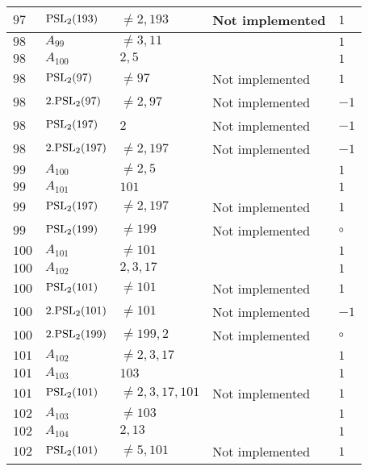 \documentclass[a4paper, 11pt]{article}
\begin{document}
\begin{longtable}{lllll}
        $ 97 $ & $ {\rm PSL}_{2}(193) $ & $ \neq 2, 193 $ & Not implemented & $ 1  $ \\ \hline
        $ 98 $ & $ A_{99} $ & $ \neq 3, 11 $ & $ ~ $ & $ 1  $ \\ \hline
        $ 98 $ & $ A_{100} $ & $ 2, 5 $ & $ ~ $ & $ 1  $ \\ \hline
        $ 98 $ & $ {\rm PSL}_{2}(97) $ & $ \neq 97 $ & Not implemented & $ 1  $ \\ \hline
        $ 98 $ & $ 2.{\rm PSL}_{2}(97) $ & $ \neq 2, 97 $ & Not implemented & $ -1  $ \\ \hline
        $ 98 $ & $ {\rm PSL}_{2}(197) $ & $ 2 $ & Not implemented & $ -1  $ \\ \hline
        $ 98 $ & $ 2.{\rm PSL}_{2}(197) $ & $ \neq 2, 197 $ & Not implemented & $ -1  $ \\ \hline
        $ 99 $ & $ A_{100} $ & $ \neq 2, 5 $ & $ ~ $ & $ 1  $ \\ \hline
        $ 99 $ & $ A_{101} $ & $ 101 $ & $ ~ $ & $ 1  $ \\ \hline
        $ 99 $ & $ {\rm PSL}_{2}(197) $ & $ \neq 2, 197 $ & Not implemented & $ 1  $ \\ \hline
        $ 99 $ & $ {\rm PSL}_{2}(199) $ & $ \neq 199 $ & Not implemented & $\circ$ \\ \hline
        $ 100 $ & $ A_{101} $ & $ \neq 101 $ & $ ~ $ & $ 1  $ \\ \hline
        $ 100 $ & $ A_{102} $ & $ 2, 3, 17 $ & $ ~ $ & $ 1  $ \\ \hline
        $ 100 $ & $ {\rm PSL}_{2}(101) $ & $ \neq 101 $ & Not implemented & $ 1  $ \\ \hline
        $ 100 $ & $ 2.{\rm PSL}_{2}(101) $ & $ \neq 101 $ & Not implemented & $ -1  $ \\ \hline
        $ 100 $ & $ 2.{\rm PSL}_{2}(199) $ & $ \neq 199, 2 $ & Not implemented & $\circ$ \\ \hline
        $ 101 $ & $ A_{102} $ & $ \neq 2, 3, 17 $ & $ ~ $ & $ 1  $ \\ \hline
        $ 101 $ & $ A_{103} $ & $ 103 $ & $ ~ $ & $ 1  $ \\ \hline
        $ 101 $ & $ {\rm PSL}_{2}(101) $ & $ \neq 2, 3, 17, 101 $ & Not implemented & $ 1  $ \\ \hline
        $ 102 $ & $ A_{103} $ & $ \neq 103 $ & $ ~ $ & $ 1  $ \\ \hline
        $ 102 $ & $ A_{104} $ & $ 2, 13 $ & $ ~ $ & $ 1  $ \\ \hline
        $ 102 $ & $ {\rm PSL}_{2}(101) $ & $ \neq 5, 101 $ & Not implemented & $ 1  $ \\ \hline

\end{longtable}
\end{document}
